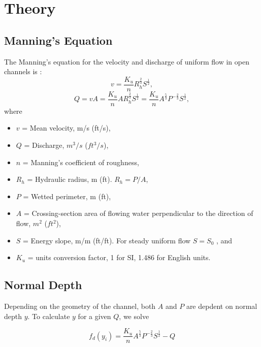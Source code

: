\section{Theory}
\subsection{Manning's Equation}
The Manning's equation for the velocity and discharge of uniform flow in open channels is \cite{Chow1959,French1985,hds4,Munson2013}:
\begin{equation}  
v = \frac{K_u}{n}R_h^{\frac{2}{3}}S^{\frac{1}{2}},
\label{Eq:v}
\end{equation}
\begin{equation}  
Q = vA = \frac{K_u}{n}AR_h^{\frac{2}{3}}S^{\frac{1}{2}}=\frac{K_u}{n}A^{\frac{5}{3}}P^{-\frac{2}{3}}S^{\frac{1}{2}},
\label{Eq:Q}
\end{equation}
where
\begin{itemize}
\item[] $v$ = Mean velocity, m/s (ft/s),
\item[] $Q$ = Discharge, $m^3/s$ ($ft^3/s$),
\item[] $n$ = Manning's coefficient of roughness,
\item[] $R_h$ = Hydraulic radius, m (ft). $R_h = P/A$,
\item [] $P$ = Wetted perimeter, m (ft),
\item [] $A$ = Crossing-section area of flowing water perpendicular to the direction of flow, $m^2$ ($ft^2$),
\item[] $S$ = Energy slope, m/m (ft/ft). For steady uniform flow $S=S_0$ , and
\item[] $K_u$ = units conversion factor, 1 for SI, 1.486 for English units.
\end{itemize}

\subsection{Normal Depth}
Depending on the geometry of the channel, both $A$ and $P$ are depdent on normal depth $y$. To calculate $y$ for a given $Q$, we solve 

\begin{equation}  
f_d(y_{i})= \frac{K_u}{n}A^{\frac{5}{3}}P^{-\frac{2}{3}}S^{\frac{1}{2}} - Q 
\end{equation}

